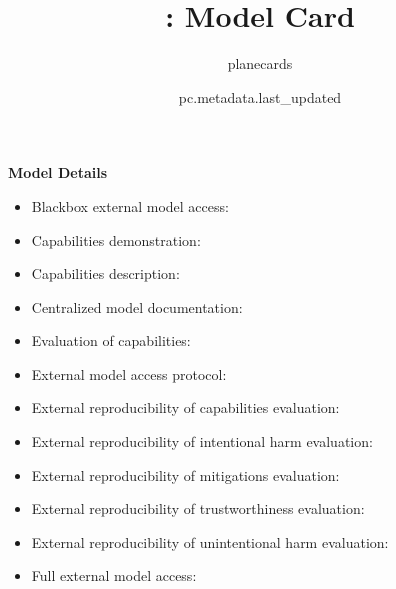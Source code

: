 \documentclass{article}
\title{\VAR{pc.metadata.name}: Model Card}
\author{planecards}
\date{pc.metadata.last_updated}
\begin{document}
\newenvironment{mcsection}[1]
    {
        \textbf{#1}


        \begin{itemize}[leftmargin=*,topsep=0pt,itemsep=-1ex,partopsep=1ex,parsep=1ex,after=\vspace{\medskipamount}]
    }
    {
        \end{itemize}
    }

\begin{adjustwidth}{-60pt}{-30pt}
\begin{singlespace}

\begin{tcolorbox}[title=\textbf{\VAR{pc.metadata.name} : Model Card},
    breakable, sharp corners, boxrule=0.7pt]

\begin{mcsection}{Model Details}
    \item Blackbox external model access: 
    \item Capabilities demonstration: 
    \item Capabilities description: 
    \item Centralized model documentation: 
    \item Evaluation of capabilities: 
    \item External model access protocol: 
    \item External reproducibility of capabilities evaluation: 
    \item External reproducibility of intentional harm evaluation: 
    \item External reproducibility of mitigations evaluation: 
    \item External reproducibility of trustworthiness evaluation: 
    \item External reproducibility of unintentional harm evaluation: 
    \item Full external model access: 

\end{mcsection}
\end{tcolorbox}
\end{singlespace}
\end{adjustwidth}
\end{document}
